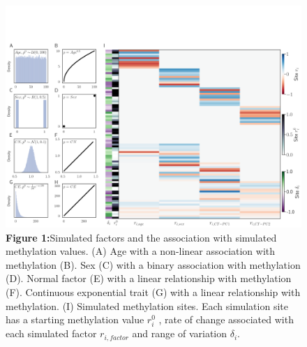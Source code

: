 \documentclass{article}
\begin{document}
{\begin{center}
    \begin{figure}
    \includegraphics[scale=.25]{Figures/Figure1.png}    
    \footnotesize
    \caption*{\small \textbf{Figure 1:}Simulated factors and the association with simulated methylation values. (A) Age with a non-linear association with methylation 
(B). Sex (C) with a binary association with methylation (D). Normal factor (E) with a linear relationship with methylation (F). Continuous exponential
 trait (G) with a linear relationship with methylation. (I) Simulated methylation sites. Each simulation site has a starting methylation value $r^0_i$ ,
  rate of change associated with each simulated factor $r_{i, factor}$ and range of variation $\delta_i$.}
    \end{figure}
\end{center}

}
\end{document}
